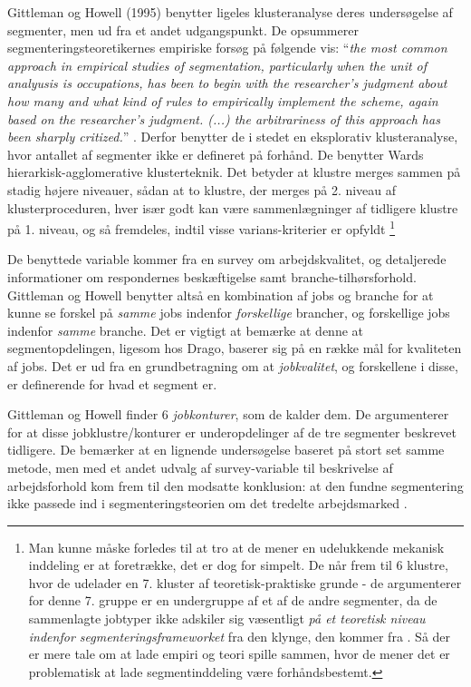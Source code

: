 Gittleman og Howell (1995) benytter ligeles klusteranalyse deres undersøgelse af segmenter, men ud fra et andet udgangspunkt. De opsummerer segmenteringsteoretikernes empiriske forsøg på følgende vis: “\emph{the most common approach in empirical studies of segmentation, particularly when the unit of analyusis is occupations, has been to begin with the researcher's judgment about how many and what kind of rules to empirically implement the scheme, again based on the researcher's judgment. (...) the arbitrariness of this approach has been sharply critized.}” \parencite[422]{Gittleman1995}. Derfor benytter de i stedet en eksplorativ klusteranalyse, hvor antallet af segmenter ikke er defineret på forhånd. De benytter Wards hierarkisk-agglomerative klusterteknik. Det betyder at klustre merges sammen på stadig højere niveauer, sådan at to klustre, der merges på 2. niveau af klusterproceduren, hver især godt kan være sammenlægninger af tidligere klustre på 1. niveau, og så fremdeles, indtil visse varians-kriterier er opfyldt \parencite[425]{Gittleman1995}%
%
\footnote{
Man kunne måske forledes til at tro at de mener en udelukkende mekanisk inddeling er at foretrække, det er dog for simpelt. De når frem til 6 klustre, hvor de udelader en 7. kluster af teoretisk-praktiske grunde - de argumenterer for denne 7. gruppe er en undergruppe af et af de andre segmenter, da de sammenlagte jobtyper ikke adskiler sig væsentligt \emph{på et teoretisk niveau indenfor segmenteringsframeworket} fra den klynge, den kommer fra \parencite[424]{Gittleman1995}. Så der er mere tale om at lade empiri og teori spille sammen, hvor de mener det er problematisk at lade segmentinddeling være forhåndsbestemt.}%
%

De benyttede variable kommer fra en survey om arbejdskvalitet, og detaljerede informationer om respondernes beskæftigelse samt branche-tilhørsforhold. Gittleman og Howell benytter altså en kombination af jobs og branche for at kunne se forskel på \emph{samme} jobs indenfor \emph{forskellige} brancher, og forskellige jobs indenfor \emph{samme} branche. 
Det er vigtigt at bemærke at denne at segmentopdelingen, ligesom hos Drago, baserer sig på en række mål for kvaliteten af jobs. Det er ud fra en grundbetragning om at \emph{jobkvalitet}, og forskellene i disse, er definerende for hvad et segment er. 

Gittleman og Howell finder 6 \emph{jobkonturer}, som de kalder dem. De argumenterer for at disse jobklustre/konturer er underopdelinger af de tre segmenter beskrevet tidligere. De bemærker at en lignende undersøgelse baseret på stort set samme metode, men med et andet udvalg af survey-variable til beskrivelse af arbejdsforhold kom frem til den modsatte konklusion: at den fundne segmentering ikke passede ind i segmenteringsteorien om det tredelte arbejdsmarked \parencite[428]{Gittleman1995}. 

